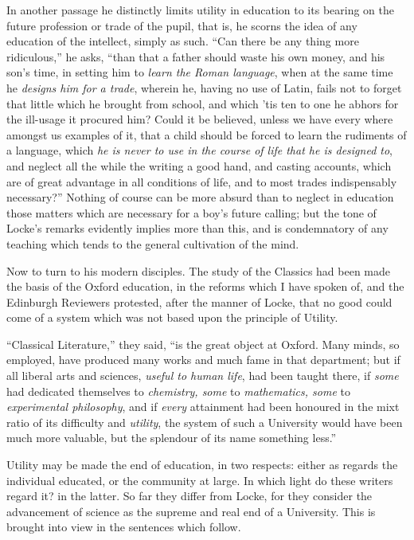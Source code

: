 In another passage he distinctly limits utility in education to its
bearing on the future profession or trade of the pupil, that is, he
scorns the idea of any education of the intellect, simply as such.
``Can there be any thing more ridiculous,'' he asks,
``than that a father should waste his own money, and his son's
time, in setting him to \emph{learn the Roman language}, when at the
same time he \emph{designs him for a trade}, wherein he, having no use
of Latin, fails not to forget that little which he brought from
school, and which 'tis ten to one he abhors for the ill-usage it
procured him? Could it be believed, unless we have every where amongst
us examples of it, that a child should be forced to learn the
rudiments of a language, which \emph{he is never to use in the
course of life that he is designed to}, and neglect all the while
the writing a good hand, and casting accounts, which are of great
advantage in all conditions of life, and to most trades indispensably
necessary?'' Nothing of course can be more absurd than to neglect
in education those matters which are necessary for a boy's future
calling; but the tone of Locke's remarks evidently implies more than
this, and is condemnatory of any teaching which tends to the general
cultivation of the mind.

Now to turn to his modern disciples. The study of the Classics had
been made the basis of the Oxford education, in the reforms which I
have spoken of, and the Edinburgh Reviewers protested, after the
manner of Locke, that no good could come of a system which was not
based upon the principle of Utility.

``Classical Literature,'' they said, ``is the great
object at Oxford. Many minds, so employed, have produced many works
and much fame in that department; but if all liberal arts and
sciences, \emph{useful to human life}, had been taught there, if \emph{some}
had dedicated themselves to \emph{chemistry, some} to \emph{mathematics,
some} to \emph{experimental philosophy}, and if \emph{every}
attainment had been honoured in the mixt ratio of its difficulty and \emph{utility},
the system of such a University would have been much more valuable,
but the splendour of its name something less.''

Utility may be made the end of education, in two respects: either
as regards the individual educated, or the community at large. In
which light do these writers regard it? in the latter. So far they
differ from Locke, for they consider the advancement of science as the
supreme and real end of a University. This is brought into view in the
sentences which follow.


